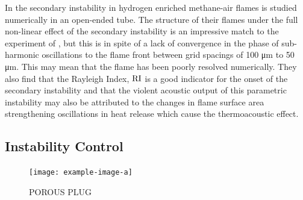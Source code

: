 {In \cite{jun2023ParametricInstabilityPropagating} the secondary instability in hydrogen enriched methane-air flames is studied numerically in an open-ended tube. The structure of their flames under the full non-linear effect of the secondary instability is an impressive match to the experiment of \cite{ebieto2017DynamicsPremixedFlames}, but this is in spite of a lack of convergence in the phase of sub-harmonic oscillations to the flame front between grid spacings of 100 μm to 50 μm. This may mean that the flame has been poorly resolved numerically. They also find that the Rayleigh Index, $\rm{RI}$ is a good indicator for the onset of the secondary instability and that the violent acoustic output of this parametric instability may also be attributed to the changes in flame surface area strengthening oscillations in heat release which cause the thermoacoustic effect.
}





\subsection{Instability Control}


\begin{figure}[t]
\centering
\texttt{[image: example-image-a]}
\caption{POROUS PLUG}
\label{fig:porous-plug}
\end{figure}

